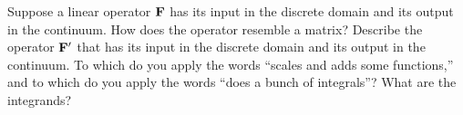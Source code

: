 \begin{exer}
\item
Suppose a linear operator $\bold F$ has
its input in the discrete domain and
its output in the continuum.
How does the operator resemble a matrix?
Describe the operator $\bold F'$ that has
its input in the discrete domain and
its output in the continuum.
To which do you apply the words
``scales and adds some functions,''
and to which do you apply the words
``does a bunch of integrals''?
What are the integrands?

%
%
%


\end{exer}
